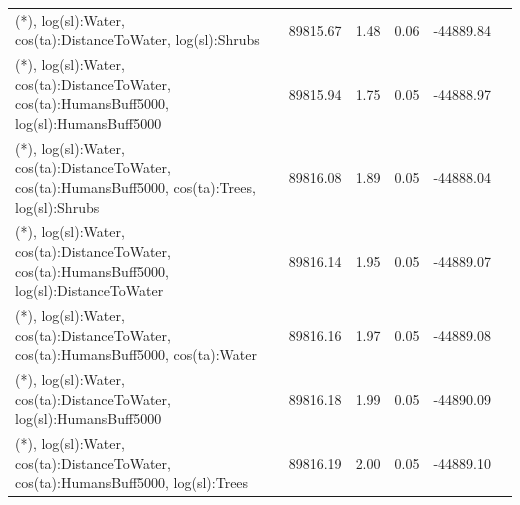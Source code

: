 \documentclass[abstract=on,10pt,a4paper,bibliography=totocnumbered]{scrartcl}
\begin{document}
\begin{table}[h]
\begin{center}
{\begin{tabular}{llllll}
        (*), log(sl):Water, cos(ta):DistanceToWater, log(sl):Shrubs &
          89815.67 &
            1.48 &
              0.06 &
                -44889.84 \\
        (*), log(sl):Water, cos(ta):DistanceToWater, cos(ta):HumansBuff5000, log(sl):HumansBuff5000 &
          89815.94 &
            1.75 &
              0.05 &
                -44888.97 \\
        (*), log(sl):Water, cos(ta):DistanceToWater, cos(ta):HumansBuff5000, cos(ta):Trees, log(sl):Shrubs &
          89816.08 &
            1.89 &
              0.05 &
                -44888.04 \\
        (*), log(sl):Water, cos(ta):DistanceToWater, cos(ta):HumansBuff5000, log(sl):DistanceToWater &
          89816.14 &
            1.95 &
              0.05 &
                -44889.07 \\
        (*), log(sl):Water, cos(ta):DistanceToWater, cos(ta):HumansBuff5000, cos(ta):Water &
          89816.16 &
            1.97 &
              0.05 &
                -44889.08 \\
        (*), log(sl):Water, cos(ta):DistanceToWater, log(sl):HumansBuff5000 &
          89816.18 &
            1.99 &
              0.05 &
                -44890.09 \\
        (*), log(sl):Water, cos(ta):DistanceToWater, cos(ta):HumansBuff5000, log(sl):Trees &
          89816.19 &
            2.00 &
              0.05 &
                -44889.10 \\
      \bottomrule
      \end{tabular}
    }
  \end{center}
\end{table}
\end{document}
